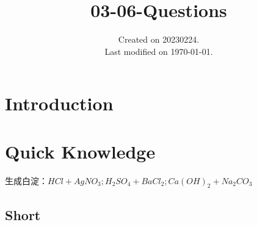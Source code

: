 \documentclass[UTF8]{../03-Chemistry}
\begin{document}
\title{03-06-Questions}
\date{Created on 20230224.\\   Last modified on \today.}
\maketitle
\tableofcontents


\chapter{Introduction}


\chapter{Quick Knowledge}

\begin{proposition}
生成白淀：$HCl + AgNO_3;H_2SO_4 + BaCl_2;Ca(OH)_2+Na_2CO_3$
\end{proposition}


\section{Short}
\end{document}
